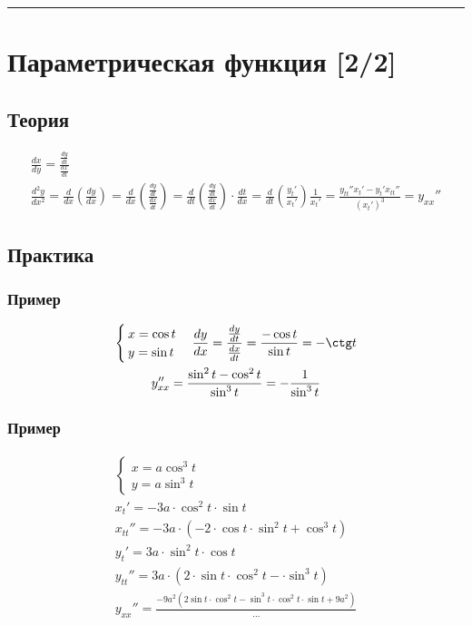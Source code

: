 \documentclass{article}
\begin{document}
\par\noindent\rule{\textwidth}{1pt}
\section{Параметрическая функция [2/2]}

\subsection{Теория}
\begin{gather*}
    \frac{dx}{dy} = \frac{\frac{dy}{dt}}{\frac{dx}{dt}} \\
    \frac{d^2y}{dx^2} = \frac{d}{dx} \left( \frac{dy}{dx} \right) =
    \frac{d}{dx} \left( \frac{\frac{dy}{dt}}{\frac{dx}{dt}} \right) =
    \frac{d}{dt} \left( \frac{\frac{dy}{dt}}{\frac{dx}{dt}} \right) \cdot \frac{dt}{dx} =
    \frac{d}{dt} \left( \frac{y_t'}{x_t'} \right) \frac{1}{x_t'} =
    \frac{y_{tt}'' x_t' - y_t' x_{tt}''}{(x_t')^3} = y_{xx}''
\end{gather*}


\subsection{Практика}

\subsubsection{Пример}
\begin{gather*}
    \begin{cases}
        x = \cos t \\
        y = \sin t
    \end{cases}
    \frac{dy}{dx} = 
    \frac{\frac{dy}{dt}}{\frac{dx}{dt}} = 
    \frac{-\cos t}{\sin t} = 
    -\ctg t \\
    y_{xx}'' = \frac{\sin^2 t - \cos^2 t}{\sin^3 t} = -\frac{1}{\sin^3 t}
\end{gather*}


\subsubsection{Пример}
\begin{gather*}
    \begin{cases}
        x = a \cos^3 t \\
        y = a \sin^3 t
    \end{cases} \\
    x_t'     = -3a \cdot \cos^2 t \cdot \sin t \\
    x_{tt}'' = -3a \cdot \left( -2 \cdot \cos t \cdot \sin^2 t + \cos^3 t \right) \\
    y_t'     = 3a \cdot \sin^2 t \cdot \cos t \\
    y_{tt}'' = 3a \cdot \left( 2 \cdot \sin t \cdot \cos^2 t - \cdot \sin^3 t \right) \\
    y_{xx}'' = \frac{-9a^2 \left( 2 \sin t \cdot \cos^2 t - \sin^3 t \cdot \cos^2 t  \cdot \sin t + 9a^2\right)}{...}
\end{gather*}
\end{document}
